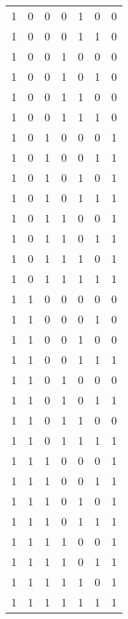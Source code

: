 \begin{longtable}[c]{rrrrrrr}
        1 & 0 & 0 & 0 & 1 & 0 & 0 \\
        1 & 0 & 0 & 0 & 1 & 1 & 0 \\
        1 & 0 & 0 & 1 & 0 & 0 & 0 \\
        1 & 0 & 0 & 1 & 0 & 1 & 0 \\
        1 & 0 & 0 & 1 & 1 & 0 & 0 \\
        1 & 0 & 0 & 1 & 1 & 1 & 0 \\
        1 & 0 & 1 & 0 & 0 & 0 & 1 \\
        1 & 0 & 1 & 0 & 0 & 1 & 1 \\
        1 & 0 & 1 & 0 & 1 & 0 & 1 \\
        1 & 0 & 1 & 0 & 1 & 1 & 1 \\
        1 & 0 & 1 & 1 & 0 & 0 & 1 \\
        1 & 0 & 1 & 1 & 0 & 1 & 1 \\
        1 & 0 & 1 & 1 & 1 & 0 & 1 \\
        1 & 0 & 1 & 1 & 1 & 1 & 1 \\
        1 & 1 & 0 & 0 & 0 & 0 & 0 \\
        1 & 1 & 0 & 0 & 0 & 1 & 0 \\
        1 & 1 & 0 & 0 & 1 & 0 & 0 \\
        1 & 1 & 0 & 0 & 1 & 1 & 1 \\
        1 & 1 & 0 & 1 & 0 & 0 & 0 \\
        1 & 1 & 0 & 1 & 0 & 1 & 1 \\
        1 & 1 & 0 & 1 & 1 & 0 & 0 \\
        1 & 1 & 0 & 1 & 1 & 1 & 1 \\
        1 & 1 & 1 & 0 & 0 & 0 & 1 \\
        1 & 1 & 1 & 0 & 0 & 1 & 1 \\
        1 & 1 & 1 & 0 & 1 & 0 & 1 \\
        1 & 1 & 1 & 0 & 1 & 1 & 1 \\
        1 & 1 & 1 & 1 & 0 & 0 & 1 \\
        1 & 1 & 1 & 1 & 0 & 1 & 1 \\
        1 & 1 & 1 & 1 & 1 & 0 & 1 \\
        1 & 1 & 1 & 1 & 1 & 1 & 1 \\

\end{longtable}

